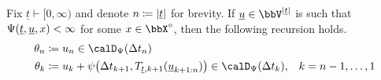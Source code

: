 \begin{proposition}
  \label{proposition:moment-to-twist}
  Fix $\underline t \vdash [0,\infty)$ and denote $n \coloneqq |\underline t|$ for brevity.
  If $\underline\momentVar \in \vecSpace^{|\underline t|}$ is such that $\Psi(\underline t, \underline{u}, x) < \infty$ for some $\stateVar \in \stateSpace^\circ$, then the following recursion holds.
  \begin{equation}
    \label{eq:moment-to-twist}
    \begin{aligned}
      \twistVar_n &\defeq \momentVar_n \in \momentSpace(\Delta t_n) \\
      \twistVar_k &\defeq \momentVar_k + \affPart\big(\Delta t_{k+1}, \momentToTwist_{\underline t,k+1}(\underline\momentVar_{k+1:n})\big) \in \momentSpace(\Delta t_k), & k = n-1, \ldots, 1
    \end{aligned}
  \end{equation}
\end{proposition}
